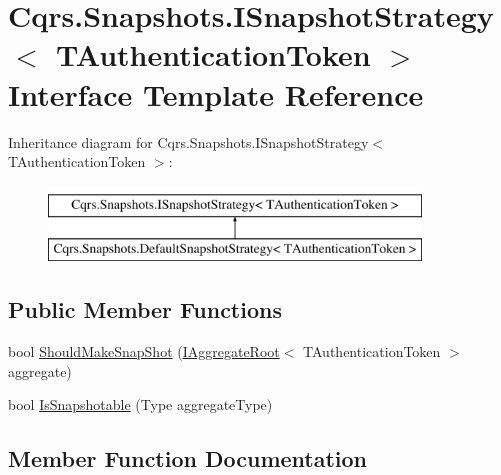 \hypertarget{interfaceCqrs_1_1Snapshots_1_1ISnapshotStrategy}{}\section{Cqrs.\+Snapshots.\+I\+Snapshot\+Strategy$<$ T\+Authentication\+Token $>$ Interface Template Reference}
\label{interfaceCqrs_1_1Snapshots_1_1ISnapshotStrategy}
Inheritance diagram for Cqrs.\+Snapshots.\+I\+Snapshot\+Strategy$<$ T\+Authentication\+Token $>$\+:\begin{figure}[H]
\begin{center}
\leavevmode
\includegraphics[height=2.000000cm]{interfaceCqrs_1_1Snapshots_1_1ISnapshotStrategy}
\end{center}
\end{figure}
\subsection*{Public Member Functions}
\begin{DoxyCompactItemize}
\item 
bool \hyperlink{interfaceCqrs_1_1Snapshots_1_1ISnapshotStrategy_ab1d54cd76c7ac832329cb3a6de0effcd}{Should\+Make\+Snap\+Shot} (\hyperlink{interfaceCqrs_1_1Domain_1_1IAggregateRoot}{I\+Aggregate\+Root}$<$ T\+Authentication\+Token $>$ aggregate)
\item 
bool \hyperlink{interfaceCqrs_1_1Snapshots_1_1ISnapshotStrategy_a02121821312c4ce2811b31eeaffabe51}{Is\+Snapshotable} (Type aggregate\+Type)
\end{DoxyCompactItemize}


\subsection{Member Function Documentation}
\mbox{\label{interfaceCqrs_1_1Snapshots_1_1ISnapshotStrategy_a02121821312c4ce2811b31eeaffabe51}} 
